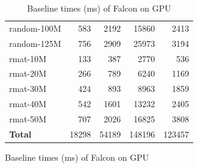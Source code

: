 \begin{figure}
\begin{minipage}{0.45\textwidth}
\begin{table}[H]
\begin{tabular}{|l|r|r|r|r|}
random-100M	& 583	& 2192	& 15860	& 2413  \\
random-125M	& 756	& 2909	& 25973	& 3194  \\
rmat-10M	& 133	& 387	& 2770	& 536   \\
rmat-20M	& 266	& 789	& 6240	& 1169  \\
rmat-30M	& 424	& 893	& 8963	& 1859  \\
rmat-40M	& 542	& 1601	& 13232	& 2405  \\
rmat-50M	& 707	& 2026	& 16825	& 3808  \\
\hline                                   
\textbf{Total}		& 18298	& 54189	& 148196&  123457 \\
\hline
\end{tabular}
\caption{Baseline times (ms) of Falcon on GPU}
\label{expt:baselines}
\end{table}
\end{minipage}
\end{figure}


